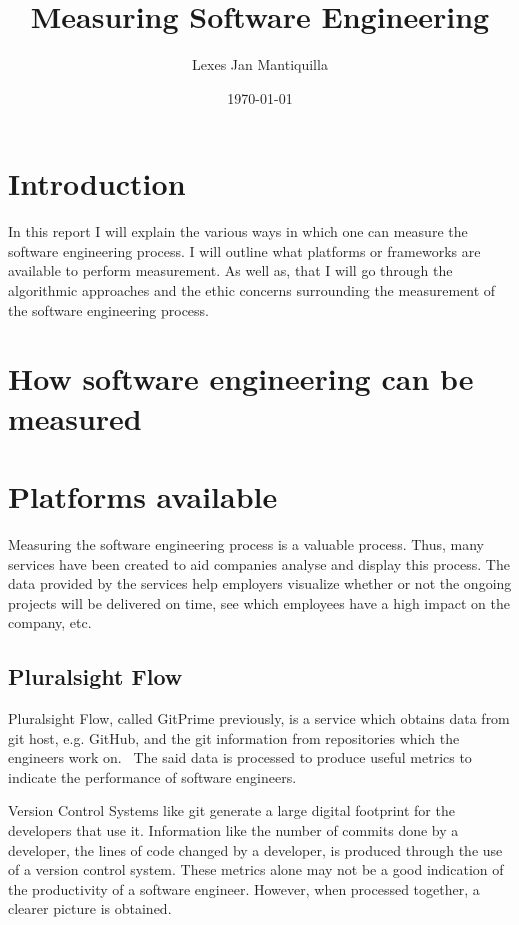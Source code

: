 \documentclass{article}
\title{Measuring Software Engineering}
\author{Lexes Jan Mantiquilla}
\date{\today}
\begin{document}
\maketitle
\tableofcontents
\newpage

\section{Introduction}
In this report I will explain the various ways in which one can measure the
software engineering process. I will outline what platforms or frameworks are
available to perform measurement. As well as, that I will go through the
algorithmic approaches and the ethic concerns surrounding the measurement of
the software engineering process.

\section{How software engineering can be measured}

\section{Platforms available}
Measuring the software engineering process is a valuable process. Thus, many
services have been created to aid companies analyse and display this process.
The data provided by the services help employers visualize whether or not the
ongoing projects will be delivered on time, see which employees have a high
impact on the company, etc.

\subsection{Pluralsight Flow}
Pluralsight Flow, called GitPrime previously, is a service which obtains data
from git host, e.g. GitHub, and the git information from repositories which the
engineers work on.~\cite{plural2019sight} The said data is processed to produce
useful metrics to indicate the performance of software engineers.

Version Control Systems like git generate a large digital footprint for the
developers that use it. Information like the number of commits done by a
developer, the lines of code changed by a developer, is produced through the
use of a version control system. These metrics alone may not be a good
indication of the productivity of a software engineer. However, when processed
together, a clearer picture is obtained.
\end{document}
